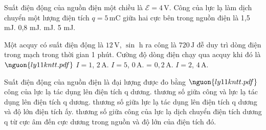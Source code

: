 \begin{ex}
Suất điện động của nguồn điện một chiều là $\mathcal{E} = 4\,\mathrm{V}$. Công của lực lạ làm dịch chuyển một lượng điện tích $q = 5\,\mathrm{mC}$ giữa hai cực bên trong nguồn điện là
\choice
{1,5 mJ.}
{0,8 mJ.}
{ mJ.}
{5 mJ.}
\end{ex}

\begin{ex}
Một acquy có suất điện động là $12\,\mathrm{V}$, $\sin$ h ra công là $720\,\mathrm{J}$ đễ duy trì dòng điện trong mạch trong thời gian 1 phút. Cường độ dòng điện chạy qua acquy khi đó là $\nguon{ly11 kntt.pdf}$
\choice
{$I = 1$, $2\,\mathrm{A}$.}
{$I = 5$, $0\,\mathrm{A}$.}
{ = $0,2\,\mathrm{A}$.}
{$I = 2$, $4\,\mathrm{A}$.}
\end{ex}


\begin{ex}
Suất điện động của nguồn điện là đại lượng được đo bằng $\nguon{ly11 kntt.pdf}$
\choice
{công của lực lạ tác dụng lên điện tích q dương.}
{thương số giữa công và lực lạ tác dụng lên điện tích q dương.}
{thương số giữa lực lạ tác dụng lên điện tích q dương và độ lớn điện tích ấy.}
{\True thương số giữa công của lực lạ dịch chuyển điện tích dương q từ cực âm đến cực dương trong nguồn và độ lớn của điện tích đó.}
\end{ex}

